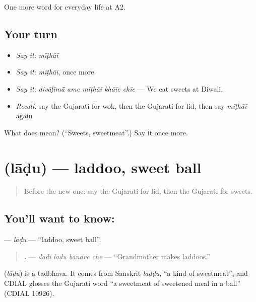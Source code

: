 \begin{grammarlens}[title={What you've built}]
One more word for everyday life at A2.
\end{grammarlens}

\subsection*{Your turn}
\begin{itemize}
\raggedright
  \item \emph{Say it:} \emph{mīṭhāī}
  \item \emph{Say it:} \emph{mīṭhāī}, once more
  \item \emph{Say it:} \emph{divāḷīmā̃ ame mīṭhāī khāīe chīe} — We eat sweets at Diwali.
  \item \emph{Recall:} say the Gujarati for wok, then the Gujarati for lid, then say \emph{mīṭhāī} again
\end{itemize}

\begin{tcolorbox}[breakable,colback=teal!4,colframe=teal!35!black,title={Before you move on}]
What does  mean? (\textquotedblleft{}Sweets, sweetmeat\textquotedblright{}.) Say it once more.
\end{tcolorbox}
\section[\texorpdfstring{\gu{લાડુ} (lāḍu)}{લાડુ (lāḍu)}]{ (lāḍu) — laddoo, sweet ball}

\label{lesson:GU-C170-ladu}



\begin{quote}
Before the new one: say the Gujarati for lid, then the Gujarati for sweets.
\end{quote}

\subsection*{You'll want to know: }
\textbf{} — \emph{lāḍu} — \textquotedblleft{}laddoo, sweet ball\textquotedblright{}.

\begin{quote}
\textbf{   .} — \emph{dādī lāḍu banāve che} — \textquotedblleft{}Grandmother makes laddoos.\textquotedblright{}
\end{quote}

\begin{cousinweb}
\textbf{} (\emph{lāḍu}) is a tadbhava. It comes from Sanskrit \emph{laḍḍu}, \textquotedblleft{}a kind of sweetmeat\textquotedblright{}, and CDIAL glosses the Gujarati word \textquotedblleft{}a sweetmeat of sweetened meal in a ball\textquotedblright{} (CDIAL 10926).
\end{cousinweb}

